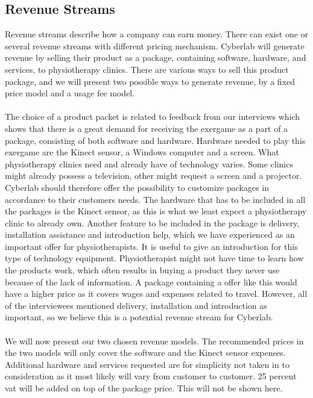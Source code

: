 \subsection{Revenue Streams}
Revenue streams describe how a company can earn money. There can exist one or several revenue streams with different pricing mechanism. Cyberlab will generate revenue by selling their product as a package, containing software, hardware, and services, to physiotherapy clinics. There are various ways to sell this product package, and we will present two possible ways to generate revenue, by a fixed price model and a usage fee model. \\ \\ 
The choice of a product packet is related to feedback from our interviews which shows that there is a great demand for receiving the exergame as a part of a package, consisting of both software and hardware. Hardware needed to play this exergame are the Kinect sensor, a Windows computer and a screen. What physiotherapy clinics need and already have of technology varies. Some clinics might already possess a television, other might request a screen and a projector. Cyberlab should therefore offer the possibility to customize packages in accordance to their customers needs. The hardware that has to be included in all the packages is the Kinect sensor, as this is what we least expect a physiotherapy clinic to already own. Another feature to be included in the package is delivery, installation assistance and introduction help, which we have experienced as an important offer for physiotherapists. It is useful to give an introduction for this type of technology equipment. Physiotherapist might not have time to learn how the products work, which often results in buying a product they never use because of the lack of information. A package containing a offer like this would have a higher price as it covers wages and expenses related to travel. However, all of the interviewees mentioned delivery, installation and introduction as important, so we believe this is a potential revenue stream for Cyberlab. \\ \\ 
We will now present our two chosen revenue models. The recommended prices in the two models will only cover the software and the Kinect sensor expenses. Additional hardware and services requested are for simplicity not taken in to consideration as it most likely will vary from customer to customer. 25 percent \ac{vat} will be added on top of the package price. This will not be shown here.\\ \\
